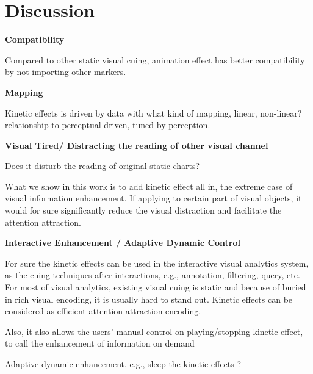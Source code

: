 \section{Discussion}

\textbf{Compatibility}

Compared to other static visual cuing, animation effect has better compatibility by not importing other markers. 

\textbf{Mapping}

Kinetic effects is driven by data with what kind of mapping, linear, non-linear? relationship to perceptual driven, tuned by perception. 


\textbf{Visual Tired/ Distracting the reading of other visual channel}

 Does it disturb the reading of original static charts?
 
 What we show in this work is to add kinetic effect all in, the extreme case of visual information enhancement. If applying to certain part of visual objects, it would for sure significantly reduce the visual distraction and facilitate the attention attraction.
  
\textbf{Interactive Enhancement / Adaptive Dynamic Control}

For sure the kinetic effects can be used in the interactive visual analytics system, as the cuing techniques after interactions, e.g., annotation, filtering, query, etc. For most of visual analytics, existing visual cuing is static and because of buried in rich visual encoding, it is usually hard to stand out. Kinetic effects can be considered as efficient attention attraction encoding. 

Also, it also allows the users' manual control on playing/stopping kinetic effect, to call the enhancement of information on demand

Adaptive dynamic enhancement, e.g., sleep the kinetic effects ?

